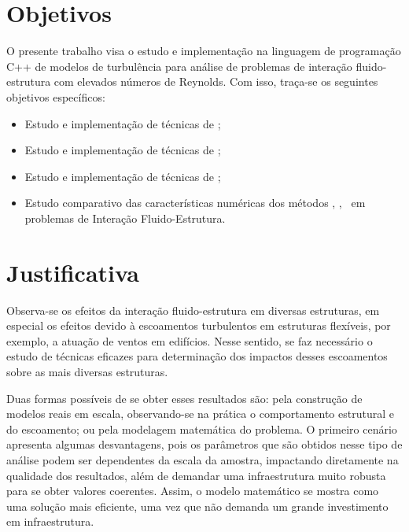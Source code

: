 \documentclass[_ArquivoPrincipal.tex]{subfiles}
\begin{document}
\section{Objetivos}

O presente trabalho visa o estudo e implementação na linguagem de programação C++ de modelos de turbulência para análise de problemas de interação fluido-estrutura com elevados números de Reynolds. Com isso, traça-se os seguintes objetivos específicos:

\begin{itemize}
    \item Estudo e implementação de técnicas de \RANS;

    \item Estudo e implementação de técnicas de \LES;

    \item Estudo e implementação de técnicas de \VMS;

    \item Estudo comparativo das características numéricas dos métodos \RANS, \LES, \VMS\ em problemas de Interação Fluido-Estrutura.
\end{itemize}

\section{Justificativa}

Observa-se os efeitos da interação fluido-estrutura em diversas estruturas, em especial os efeitos devido à escoamentos turbulentos em estruturas flexíveis, por exemplo, a atuação de ventos em edifícios. Nesse sentido, se faz necessário o estudo de técnicas eficazes para determinação dos impactos desses escoamentos sobre as mais diversas estruturas.

Duas formas possíveis de se obter esses resultados são: pela construção de modelos reais em escala, observando-se na prática o comportamento estrutural e do escoamento; ou pela modelagem matemática do problema. O primeiro cenário apresenta algumas desvantagens, pois os parâmetros que são obtidos nesse tipo de análise podem ser dependentes da escala da amostra, impactando diretamente na qualidade dos resultados, além de demandar uma infraestrutura muito robusta para se obter valores coerentes. Assim, o modelo matemático se mostra como uma solução mais eficiente, uma vez que não demanda um grande investimento em infraestrutura.
\end{document}
